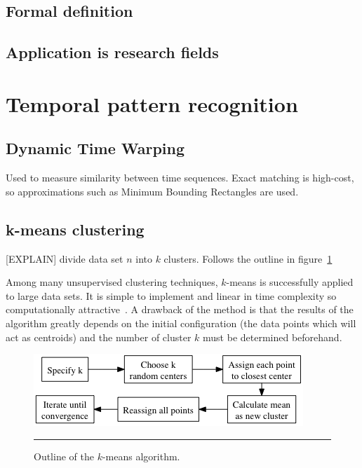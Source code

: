 
\subsection{Formal definition}






\subsection{Application is research fields}



\section{Temporal pattern recognition}

\subsection{Dynamic Time Warping}
Used to measure similarity between time sequences.
Exact matching is high-cost, so approximations such as Minimum Bounding Rectangles are used.

\subsection{k-means clustering}
[EXPLAIN] divide data set $n$ into $k$ clusters. Follows the outline in figure~\ref{fig:k_means}

Among many unsupervised clustering techniques, $k$-means is successfully applied to large data sets.
It is simple to implement and linear in time complexity so computationally attractive~\cite{jain1999data}.
A drawback of the method is that the results of the algorithm greatly depends on the initial configuration (the data points which will act as centroids) and the number of cluster $k$ must be determined beforehand.

\begin{figure}[htbp]
	\centering
		\includegraphics{./Figures/graphs/k_means.png}
		\rule{35em}{0.5pt}
	\caption[K-means]{Outline of the $k$-means algorithm.}
	\label{fig:k_means}
\end{figure}

